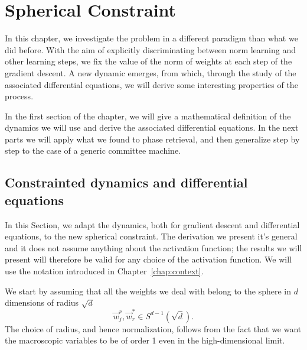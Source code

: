 \chapter{Spherical Constraint}
In this chapter, we investigate the problem in a different paradigm than what we did before.
With the aim of explicitly discriminating between norm learning and other learning steps,
we fix the value of the norm of weights at each step of the gradient descent.
A new dynamic emerges, from which, through the study of the associated differential equations,
we will derive some interesting properties of the process.

In the first section of the chapter, we will give a mathematical definition of the dynamics we will use and derive the associated differential equations.
In the next parts we will apply what we found to phase retrieval, and then generalize step by step to the case of a generic committee machine.


\section{Constrainted dynamics and differential equations}
In this Section, we adapt the dynamics, both for gradient descent and differential equations, to the new spherical constraint.
The derivation we present it's general and it does not assume anything about the activation function;
the results we will present will therefore be valid for any choice of the activation function.
We will use the notation introduced in Chapter~\ref{chap:context}.

We start by assuming that all the weights we deal with belong to the sphere in \(d\) dimensions of radius \(\sqrt{d}\)
\[
  \vec{w}^\nu_j, \vec{w}^*_r \in S^{d-1}{\left(\sqrt{d}\right)}.
\]
The choice of radius, and hence normalization, follows from the fact that we want
the macroscopic variables to be of order 1 even in the high-dimensional limit.

